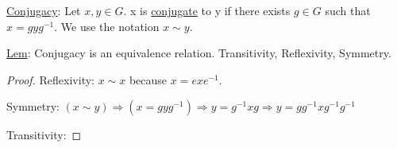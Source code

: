 \documentclass[class=scrartcl, crop=false]{standalone}
\begin{document}
\begin{definition}
  \ul{Conjugacy}: Let $x, y \in G$. x is \ul{conjugate} to y if there exists $g \in G$ such that $x = gyg^{-1}$. We use the notation $x \sim y$.

  \ul{Lem}: Conjugacy is an equivalence relation. Transitivity, Reflexivity, Symmetry.
  \begin{proof}
    Reflexivity: $x \sim x$ because $x = exe^{-1}$.

    Symmetry: $(x \sim y) \Rightarrow (x = gyg^{-1}) \Rightarrow y = g^{-1}xg \Rightarrow y = gg^{-1}xg^{-1}g^{-1}$

    Transitivity: 
  \end{proof}
\end{definition}
\end{document}
